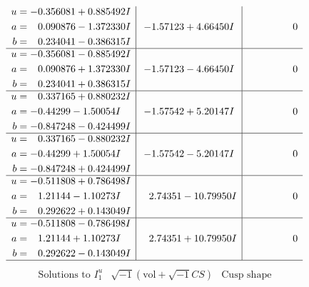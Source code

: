 \documentclass[1p]{elsarticle_modified}
\theoremstyle{definition}
\newcommand{\I}{\sqrt{-1}}
\begin{document}
$$\begin{array}{c|c|c}
\begin{aligned}
u &= -0.356081 + 0.885492 I \\
a &= \phantom{-}0.090876 - 1.372330 I \\
b &= \phantom{-}0.234041 - 0.386315 I\end{aligned}
 & -1.57123 + 4.66450 I & \phantom{-0.000000 } 0 \\ \hline\begin{aligned}
u &= -0.356081 - 0.885492 I \\
a &= \phantom{-}0.090876 + 1.372330 I \\
b &= \phantom{-}0.234041 + 0.386315 I\end{aligned}
 & -1.57123 - 4.66450 I & \phantom{-0.000000 } 0 \\ \hline\begin{aligned}
u &= \phantom{-}0.337165 + 0.880232 I \\
a &= -0.44299 - 1.50054 I \\
b &= -0.847248 - 0.424499 I\end{aligned}
 & -1.57542 + 5.20147 I & \phantom{-0.000000 } 0 \\ \hline\begin{aligned}
u &= \phantom{-}0.337165 - 0.880232 I \\
a &= -0.44299 + 1.50054 I \\
b &= -0.847248 + 0.424499 I\end{aligned}
 & -1.57542 - 5.20147 I & \phantom{-0.000000 } 0 \\ \hline\begin{aligned}
u &= -0.511808 + 0.786498 I \\
a &= \phantom{-}1.21144 - 1.10273 I \\
b &= \phantom{-}0.292622 + 0.143049 I\end{aligned}
 & \phantom{-}2.74351 - 10.79950 I & \phantom{-0.000000 } 0 \\ \hline\begin{aligned}
u &= -0.511808 - 0.786498 I \\
a &= \phantom{-}1.21144 + 1.10273 I \\
b &= \phantom{-}0.292622 - 0.143049 I\end{aligned}
 & \phantom{-}2.74351 + 10.79950 I & \phantom{-0.000000 } 0\\
 \hline 
 \end{array}$$\newpage$$\begin{array}{c|c|c}  
\text{Solutions to }I^u_{1}& \I (\text{vol} + \sqrt{-1}CS) & \text{Cusp shape}\\
 \hline 
\begin{aligned}

\end{aligned}
\end{array}$$
\end{document}
